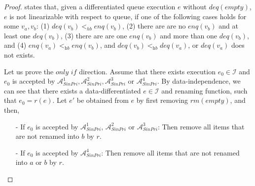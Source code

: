 %


\begin {proof}

\cite{DBLP:conf/icalp/BouajjaniEEH15} states that, given a differentiated queue execution $e$ without $\textit{deq}(\textit{empty})$, $e$ is not linearizable with respect to queue, if one of the following cases holds for some $v_a,v_b$: (1) $\textit{deq}(v_b) <_{hb} \textit{enq}(v_b)$, (2) there are are no $\textit{enq}(v_b)$ and at least one $\textit{deq}(v_b)$, (3) there are are one $\textit{enq}(v_b)$ and more than one $\textit{deq}(v_b)$, and (4) $\textit{enq}(v_a) <_{\textit{hb}} \textit{enq}(v_b)$, and $\textit{deq}(v_b) <_{\textit{hb}} \textit{deq}(v_a)$, or $\textit{deq}(v_a)$ does not exists.

Let us prove the $\textit{only if}$ direction. Assume that there exists execution $e_0 \in \mathcal{I}$ and $e_0$ is accepted by $\mathcal{A}_{\textit{SinPri}}^1, \mathcal{A}_{\textit{SinPri}}^2, \mathcal{A}_{\textit{SinPri}}^3$ or $\mathcal{A}_{\textit{SinPri}}^4$. By data-independence, we can see that there exists a data-differentiated $e \in \mathcal{I}$ and renaming function, such that $e_0=r(e)$. Let $e'$ be obtained from $e$ by first removing $\textit{rm}(\textit{empty})$, and then,

\begin{itemize}
\setlength{\itemsep}{0.5pt}
\item[-] If $e_0$ is accepted by $\mathcal{A}_{\textit{SinPri}}^1$, $\mathcal{A}_{\textit{SinPri}}^2$ or $\mathcal{A}_{\textit{SinPri}}^3$: Then remove all items that are not renamed into $b$ by $r$.

\item[-] If $e_0$ is accepted by $\mathcal{A}_{\textit{SinPri}}^4$: Then remove all items that are not renamed into $a$ or $b$ by $r$.
\end{itemize}


\end{proof}
